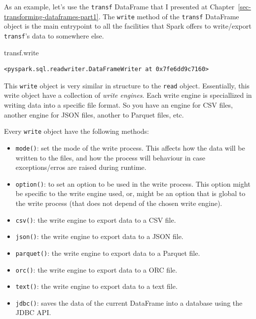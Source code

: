 \documentclass[
  11pt,
  letterpaper,
  DIV=11,
  numbers=noendperiod]{scrreprt}
\newenvironment{Shaded}{\begin{snugshade}}{\end{snugshade}}
\newcommand{\NormalTok}[1]{\textcolor[rgb]{0.00,0.23,0.31}{#1}}
\providecommand{\tightlist}{%
  \setlength{\itemsep}{0pt}\setlength{\parskip}{0pt}}\usepackage{longtable,booktabs,array}
\begin{document}
As an example, let's use the \texttt{transf} DataFrame that I presented
at Chapter~\ref{sec-transforming-dataframes-part1}. The \texttt{write}
method of the \texttt{transf} DataFrame object is the main entrypoint to
all the facilities that Spark offers to write/export \texttt{transf}'s
data to somewhere else.

\begin{Shaded}
\begin{Highlighting}[]
\NormalTok{transf.write}
\end{Highlighting}
\end{Shaded}

\begin{verbatim}
<pyspark.sql.readwriter.DataFrameWriter at 0x7fe6dd9c7160>
\end{verbatim}

This \texttt{write} object is very similar in structure to the
\texttt{read} object. Essentially, this write object have a collection
of \emph{write engines}. Each write engine is speciallized in writing
data into a specific file format. So you have an engine for CSV files,
another engine for JSON files, another to Parquet files, etc.

Every \texttt{write} object have the following methods:

\begin{itemize}
\tightlist
\item
  \texttt{mode()}: set the mode of the write process. This affects how
  the data will be written to the files, and how the process will
  behaviour in case exceptions/erros are raised during runtime.
\item
  \texttt{option()}: to set an option to be used in the write process.
  This option might be specific to the write engine used, or, might be
  an option that is global to the write process (that does not depend of
  the chosen write engine).
\item
  \texttt{csv()}: the write engine to export data to a CSV file.
\item
  \texttt{json()}: the write engine to export data to a JSON file.
\item
  \texttt{parquet()}: the write engine to export data to a Parquet file.
\item
  \texttt{orc()}: the write engine to export data to a ORC file.
\item
  \texttt{text()}: the write engine to export data to a text file.
\item
  \texttt{jdbc()}: saves the data of the current DataFrame into a
  database using the JDBC API.
\end{itemize}
\end{document}
